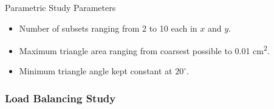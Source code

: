 \documentclass[xcolor={usenames,dvipsnames,svgnames,table}]{beamer}
\begin{document}
\begin{frame}[t]
\begin{figure}[H]
\label{alg_illustration}
\end{figure}
  \begin{block}{Parametric Study Parameters}
    \begin{itemize}
      \item Number of subsets ranging from 2 to 10 each in $x$ and $y$.
      \item Maximum triangle area ranging from coarsest possible to 0.01 cm\textsuperscript{2}.
      \item Minimum triangle angle kept constant at $20^{\circ}$.
    \end{itemize}
  \end{block}
\end{frame}

\begin{frame}[t]\frametitle{Load Balancing Study}
\begin{table}[H]
\centering
\caption{\bf The percent improvement of the original load balancing algorithm (left) and the load balancing by dimension algorithm (right).}
\end{table}
\end{frame}
\end{document}
